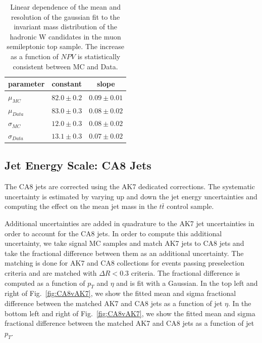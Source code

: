  \begin{table}[h!]
   \begin{center}
   \begin{tabular}{l|cc}
  \hline
  parameter & constant & slope \\
  \hline                                  
  $\mu_{MC}$                                  & $82.0\pm 0.2$ & $0.09\pm 0.01$ \\
  $\mu_{Data}$                                  & $83.0\pm 0.3$ & $0.08\pm0.02$ \\
  $\sigma_{MC}$                               & $12.0\pm 0.3$ & $0.08\pm 0.02$ \\
  $\sigma_{Data}$                               & $13.1\pm 0.3$ & $0.07\pm 0.02$ \\
  \hline
   \end{tabular}
   \end{center}
   \caption{Linear dependence of the mean and resolution of the gaussian fit to the invariant mass distribution of the hadronic 
      W candidates in the muon semileptonic top sample. The increase as a function of $NPV$ is statistically consistent between MC and Data.} 
   \label{tab:pu_TopControlSampleGausFit}
 \end{table}

\subsection{Jet Energy Scale: CA8 Jets}
\label{sec:systematicsCA8}
The CA8 jets are corrected using the AK7 dedicated corrections.  
The systematic uncertainty is estimated by varying up and down the jet energy uncertainties and computing the effect on the mean jet mass in the 
$t\bar{t}$ control sample.  

Additional uncertainties are added in quadrature to the AK7 jet uncertainties in order to account for the CA8 jets.  
In order to compute this additional uncertainty, we take signal MC samples and match AK7 jets to CA8 jets and 
take the fractional difference between them as an additional uncertainty. 
The matching is done for AK7 and CA8 collections for events passing preselection criteria and are matched with $\Delta R < 0.3$ criteria.
The fractional difference is computed as a function of $p_T$ and $\eta$ and is fit with a Gaussian.
In the top left and right of Fig.~\ref{fig:CA8vAK7}, we show the fitted mean and sigma fractional difference between the matched AK7 and CA8 jets 
as a function of jet $\eta$.
In the bottom left and right of Fig.~\ref{fig:CA8vAK7}, we show the fitted mean and sigma fractional difference between the matched AK7 and CA8 jets 
as a function of jet $p_T$.

